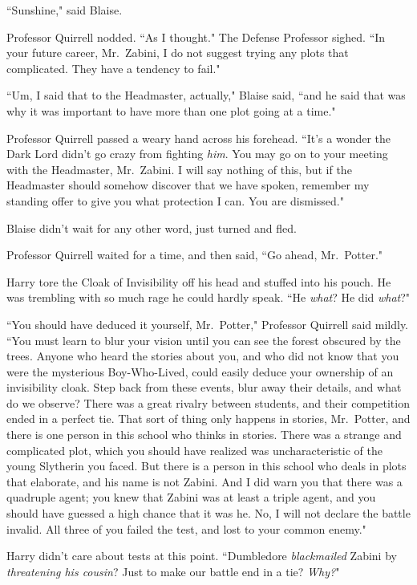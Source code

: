 ``Sunshine," said Blaise.

Professor Quirrell nodded. ``As I thought." The Defense Professor sighed. ``In your future career, Mr.~Zabini, I do not suggest trying any plots that complicated. They have a tendency to fail."

``Um, I said that to the Headmaster, actually," Blaise said, ``and he said that was why it was important to have more than one plot going at a time."

Professor Quirrell passed a weary hand across his forehead. ``It's a wonder the Dark Lord didn't go crazy from fighting \emph{him}. You may go on to your meeting with the Headmaster, Mr.~Zabini. I will say nothing of this, but if the Headmaster should somehow discover that we have spoken, remember my standing offer to give you what protection I can. You are dismissed."

Blaise didn't wait for any other word, just turned and fled.

\later

Professor Quirrell waited for a time, and then said, ``Go ahead, Mr.~Potter."

Harry tore the Cloak of Invisibility off his head and stuffed into his pouch. He was trembling with so much rage he could hardly speak. ``He \emph{what}? He did \emph{what}?"

``You should have deduced it yourself, Mr.~Potter," Professor Quirrell said mildly. ``You must learn to blur your vision until you can see the forest obscured by the trees. Anyone who heard the stories about you, and who did not know that you were the mysterious Boy-Who-Lived, could easily deduce your ownership of an invisibility cloak. Step back from these events, blur away their details, and what do we observe? There was a great rivalry between students, and their competition ended in a perfect tie. That sort of thing only happens in stories, Mr.~Potter, and there is one person in this school who thinks in stories. There was a strange and complicated plot, which you should have realized was uncharacteristic of the young Slytherin you faced. But there is a person in this school who deals in plots that elaborate, and his name is not Zabini. And I did warn you that there was a quadruple agent; you knew that Zabini was at least a triple agent, and you should have guessed a high chance that it was he. No, I will not declare the battle invalid. All three of you failed the test, and lost to your common enemy."

Harry didn't care about tests at this point. ``Dumbledore \emph{blackmailed} Zabini by \emph{threatening his cousin}? Just to make our battle end in a tie? \emph{Why?}"

